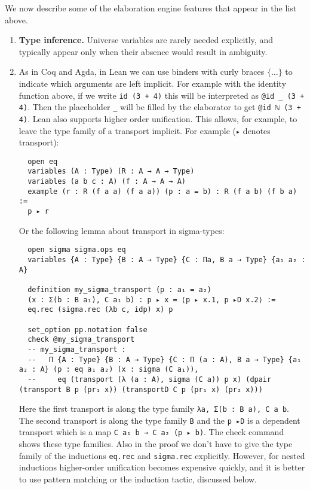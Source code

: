\documentclass[12pt]{amsart}  %
\begin{document}
We now describe some of the elaboration engine features that appear in the list above.
\begin{enumerate}
\item {\bf Type inference.}
  Universe variables are rarely needed explicitly, and typically appear only when their absence would result in ambiguity.
  
\item As in Coq and Agda, in Lean we can use binders with curly braces $\{ \dots \}$ to indicate which arguments are left implicit.
  For example with the identity function above, if we write \lstinline{id (3 + 4)} this will be interpreted as \lstinline{@id _ (3 + 4)}.
  Then the placeholder \lstinline{_} will be filled by the elaborator to get \lstinline{@id ℕ (3 + 4)}. Lean also supports higher order
  unification. This allows, for example, to leave the type family of a transport implicit. For example (\lstinline{▸} denotes transport):

\begin{lstlisting}
  open eq
  variables (A : Type) (R : A → A → Type)
  variables (a b c : A) (f : A → A → A)
  example (r : R (f a a) (f a a)) (p : a = b) : R (f a b) (f b a) :=
  p ▸ r
\end{lstlisting}

Or the following lemma about transport in sigma-types:

\begin{lstlisting}
  open sigma sigma.ops eq
  variables {A : Type} {B : A → Type} {C : Πa, B a → Type} {a₁ a₂ : A}

  definition my_sigma_transport (p : a₁ = a₂)
  (x : Σ(b : B a₁), C a₁ b) : p ▸ x = ⟨p ▸ x.1, p ▸D x.2⟩ :=
  eq.rec (sigma.rec (λb c, idp) x) p
 
  set_option pp.notation false
  check @my_sigma_transport
  -- my_sigma_transport :
  --   Π {A : Type} {B : A → Type} {C : Π (a : A), B a → Type} {a₁ a₂ : A} (p : eq a₁ a₂) (x : sigma (C a₁)),
  --     eq (transport (λ (a : A), sigma (C a)) p x) (dpair (transport B p (pr₁ x)) (transportD C p (pr₁ x) (pr₂ x)))
\end{lstlisting}

Here the first transport is along the type family \lstinline{λa, Σ(b : B a), C a b}. The second transport is along the type
family \lstinline{B} and the \lstinline{p ▸D} is a dependent transport which is a map \lstinline{C a₁ b → C a₂ (p ▸ b)}. The check command
shows these type families. Also in the proof we don't have to give the type family of the inductions \lstinline{eq.rec} and
\lstinline{sigma.rec} explicitly. However, for nested inductions higher-order unification becomes expensive quickly, and
it is better to use pattern matching or the induction tactic, discussed below.


\end{enumerate}
\end{document}
